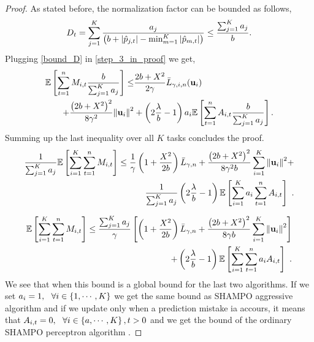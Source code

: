\begin{proof}
As stated before, the    normalization factor can be bounded as
follows,
\begin{equation*}
D_{t}=\sum_{j=1}^K\frac{a_{j}}{\left({b+\left\vert{\hat{p}_{j,t}}\right\vert-\min_{m=1}^K\left\vert{\hat{p}_{m,t}}\right\vert}\right)}\le \frac{\sum_{j=1}^Ka_{j}}{b}.
\end{equation*}
Plugging \eqref{bound_D} in \eqref{step_3_in_proof} we get,
\begin{equation}\label{eq:bound_for_i}
\begin{split}
\mathbb{E}\left[ \sum_{t=1}^{n}{M_{i,t}\frac{b}{\sum_{j=1}^Ka_{j}}} \right]
\le& \frac{2b+X^2}{2\gamma}{\bar L}_{\gamma,i,n}(\mathbf{u}_{i})\\
+\frac{\left({2b+X^2}\right)^2}{8{\gamma}^2}{\left\Vert \mathbf{u}_{i} \right\Vert}^2&+\left({2\frac{\lambda}{b}-1}\right)a_{i}\mathbb{E}\left[{\sum_{t=1}^{n}{A_{i,t}\frac{b}{\sum_{j=1}^Ka_{j}}}}\right].
\end{split}
\end{equation}
Summing up the last inequality over all $K$ tasks concludes the proof.
\begin{equation}
\begin{split}
\frac{1}{\sum_{j=1}^Ka_{j}}\mathbb{E}\left[ \sum_{i=1}^{K}\sum_{t=1}^{n}{M_{i,t}} \right]
\le\frac{1}{\gamma}\left(1+\frac{X^2}{2b} \right){\bar L}_{\gamma,n}+
\frac{\left({2b+X^2}\right)^2}{8{\gamma}^2b}\sum_{i=1}^{K}{{\left\Vert \mathbf{u}_{i} \right\Vert}^2}+\\ \frac{1}{\sum_{j=1}^Ka_{j}}\left({2\frac{\lambda}{b}-1}\right)\mathbb{E}\left[{\sum_{i=1}^{K}a_{i}\sum_{t=1}^{n}{A_{i,t}}}\right]~.
\end{split}
\label{final_eq}
\end{equation}

\begin{equation}
\begin{split}
\mathbb{E}\left[ \sum_{i=1}^{K}\sum_{t=1}^{n}{M_{i,t}} \right]
\le\frac{\sum_{j=1}^Ka_{j}}{\gamma}\left[{\left(1+\frac{X^2}{2b} \right){\bar L}_{\gamma,n}+
\frac{\left({2b+X^2}\right)^2}{8{\gamma}b}\sum_{i=1}^{K}{{\left\Vert \mathbf{u}_{i} \right\Vert}^2}}\right]\\ 
+
\left({2\frac{\lambda}{b}-1}\right)\mathbb{E}\left[{\sum_{i=1}^{K}\sum_{t=1}^{n}{a_{i}A_{i,t}}}\right]~.
\end{split}
\label{final_eq_prior}
\end{equation}
We see that when this  bound is a global bound for the last two algorithms. If we set $a_i=1, ~~\forall i\in\left\{{1,\cdots,K}\right\}$ we get the same bound as  SHAMPO aggressive algorithm and if we update only when a prediction mistake ia accours, it means that $A_{i,t}=0,~~\forall i\in\left\{{a,\cdots,K}\right\},t>0$ and we get the bound of  the ordinary SHAMPO perceptron algorithm  .
\QED
\end{proof}


